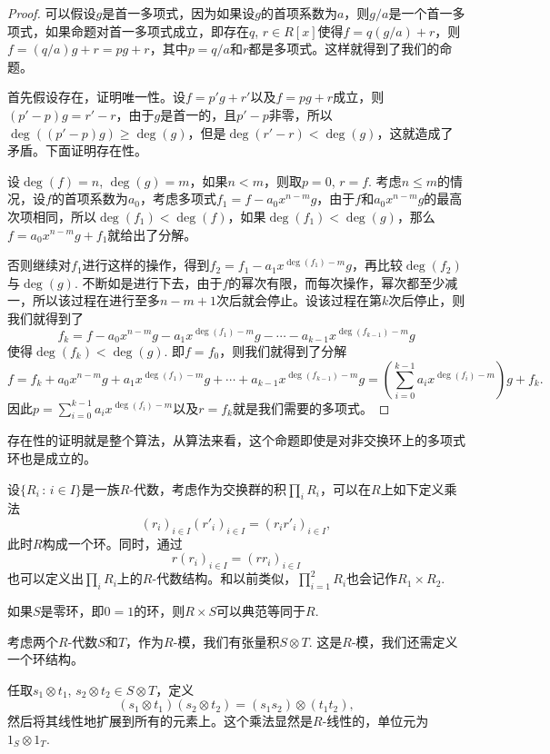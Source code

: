 \begin{proof}
	可以假设$g$是首一多项式，因为如果设$g$的首项系数为$a$，则$g/a$是一个首一多项式，如果命题对首一多项式成立，即存在$q$, $r\in R[x]$使得$f=q(g/a)+r$，则$f=(q/a)g+r=pg+r$，其中$p=q/a$和$r$都是多项式。这样就得到了我们的命题。

	首先假设存在，证明唯一性。设$f=p'g+r'$以及$f=pg+r$成立，则$(p'-p)g=r'-r$，由于$g$是首一的，且$p'-p$非零，所以$\deg((p'-p)g)\geq \deg(g)$，但是$\deg(r'-r)< \deg(g)$，这就造成了矛盾。下面证明存在性。

	设$\deg(f)=n$, $\deg(g)=m$，如果$n<m$，则取$p=0$, $r=f$. 考虑$n\leq m$的情况，设$f$的首项系数为$a_0$，考虑多项式$f_1=f-a_0x^{n-m}g$，由于$f$和$a_0x^{n-m}g$的最高次项相同，所以$\deg(f_1)<\deg(f)$，如果$\deg(f_1)<\deg(g)$，那么$f=a_0x^{n-m}g+f_1$就给出了分解。

	否则继续对$f_1$进行这样的操作，得到$f_2=f_1-a_1x^{\deg(f_1)-m}g$，再比较$\deg(f_2)$与$\deg(g)$. 不断如是进行下去，由于$f$的幂次有限，而每次操作，幂次都至少减一，所以该过程在进行至多$n-m+1$次后就会停止。设该过程在第$k$次后停止，则我们就得到了
	\[
	f_{k}=f-a_0x^{n-m}g-a_1x^{\deg(f_1)-m}g-\cdots-a_{k-1}x^{\deg(f_{k-1})-m}g
	\]
	使得$\deg(f_k)< \deg(g)$. 即$f=f_0$，则我们就得到了分解
	\[
	f=f_k+a_0x^{n-m}g+a_1x^{\deg(f_1)-m}g+\cdots+a_{k-1}x^{\deg(f_{k-1})-m}g=\left(\sum_{i=0}^{k-1}a_{i}x^{\deg(f_{i})-m}\right)g+f_k.
	\]
	因此$p=\sum_{i=0}^{k-1}a_{i}x^{\deg(f_{i})-m}$以及$r=f_k$就是我们需要的多项式。
\end{proof}

存在性的证明就是整个算法，从算法来看，这个命题即使是对非交换环上的多项式环也是成立的。

\para[$R$-代数的积]\label{alg_prod} 设$\{R_i\,:\,i\in I\}$是一族$R$-代数，考虑作为交换群的积$\prod_i R_i$，可以在$R$上如下定义乘法
\[
	(r_i)_{i\in I}(r'_i)_{i\in I}=(r_ir'_i)_{i\in I},
\]
此时$R$构成一个环。同时，通过
\[
	r(r_i)_{i\in I}=(rr_i)_{i\in I}
\]
也可以定义出$\prod_i R_i$上的$R$-代数结构。和以前类似，$\prod_{i=1}^2 R_i$也会记作$R_1\times R_2$. \endpara

如果$S$是零环，即$0=1$的环，则$R\times S$可以典范等同于$R$.

\para[$R$-代数的张量积] 考虑两个$R$-代数$S$和$T$，作为$R$-模，我们有张量积$S\otimes T$. 这是$R$-模，我们还需定义一个环结构。

任取$s_1\otimes t_1$, $s_2\otimes t_2\in S\otimes T$，定义
\[
	(s_1\otimes t_1)(s_2\otimes t_2)=(s_1s_2)\otimes (t_1t_2),
\]
然后将其线性地扩展到所有的元素上。这个乘法显然是$R$-线性的，单位元为$1_S\otimes 1_T$. \endpara

